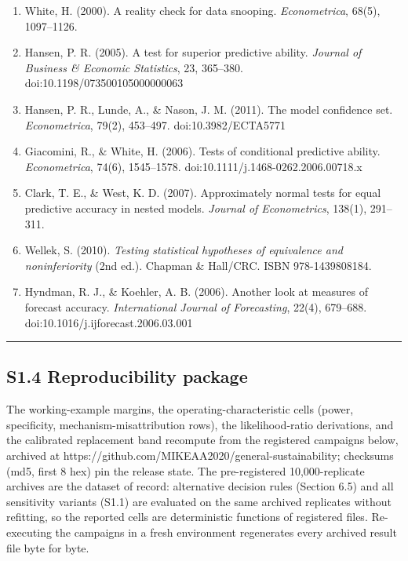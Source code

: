 \documentclass[11pt]{article}
\providecommand{\tightlist}{\setlength{\itemsep}{0.2em}\setlength{\parskip}{0pt}}
\begin{document}
\begin{enumerate}
\def\labelenumi{\arabic{enumi}.}
\tightlist
\item
  White, H. (2000). A reality check for data snooping.
  \emph{Econometrica}, 68(5), 1097--1126.
\item
  Hansen, P. R. (2005). A test for superior predictive ability.
  \emph{Journal of Business \& Economic Statistics}, 23, 365--380.
  doi:10.1198/073500105000000063
\item
  Hansen, P. R., Lunde, A., \& Nason, J. M. (2011). The model confidence
  set. \emph{Econometrica}, 79(2), 453--497. doi:10.3982/ECTA5771
\item
  Giacomini, R., \& White, H. (2006). Tests of conditional predictive
  ability. \emph{Econometrica}, 74(6), 1545--1578.
  doi:10.1111/j.1468-0262.2006.00718.x
\item
  Clark, T. E., \& West, K. D. (2007). Approximately normal tests for
  equal predictive accuracy in nested models. \emph{Journal of
  Econometrics}, 138(1), 291--311.
\item
  Wellek, S. (2010). \emph{Testing statistical hypotheses of equivalence
  and noninferiority} (2nd ed.). Chapman \& Hall/CRC. ISBN
  978-1439808184.
\item
  Hyndman, R. J., \& Koehler, A. B. (2006). Another look at measures of
  forecast accuracy. \emph{International Journal of Forecasting}, 22(4),
  679--688. doi:10.1016/j.ijforecast.2006.03.001
\end{enumerate}

\begin{center}\rule{0.5\linewidth}{0.5pt}\end{center}

\subsection{S1.4 Reproducibility
package}\label{s1.4-reproducibility-package}

The working-example margins, the operating-characteristic cells (power,
specificity, mechanism-misattribution rows), the likelihood-ratio
derivations, and the calibrated replacement band recompute from the
registered campaigns below, archived at
https://github.com/MIKEAA2020/general-sustainability; checksums (md5,
first 8 hex) pin the release state. The pre-registered 10,000-replicate
archives are the dataset of record: alternative decision rules (Section
6.5) and all sensitivity variants (S1.1) are evaluated on the same
archived replicates without refitting, so the reported cells are
deterministic functions of registered files. Re-executing the campaigns
in a fresh environment regenerates every archived result file byte for
byte.
\end{document}
